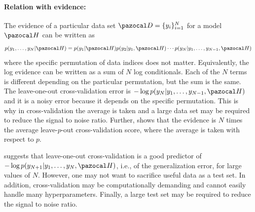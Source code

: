 \paragraph{Relation with evidence:} The evidence of a particular data set $\cD=\{y_i\}_{i=1}^N$ for a model $\cH$ can be written as
\begin{equation}
	p(y_1,\dots,y_N|\cH)=p(y_1|\cH)p(y_2|y_1,\cH)\cdots p(y_N|y_1,\dots,y_{N-1},\cH)
\end{equation}
where the specific permutation of data indices does not matter. 
Equivalently, the log evidence can be written as a sum of $N$ log conditionals.
Each of the $N$ terms is different depending on the particular permutation, but the sum is the same. 
The leave-one-out cross-validation error is $-\log p(y_N|y_1,\dots,y_{N-1},\cH)$ and it is a noisy error because it depends on the specific permutation. 
This is why in cross-validation the average is taken and a large data set may be required to reduce the signal to noise ratio. 
Further, \textcite{fong2020marginal} shows that the evidence is $N$ times the average leave-$p$-out cross-validation score, where the average is taken with respect to $p$.

\textcite{mackay1992bayesian} suggests that leave-one-out cross-validation is a good predictor of $-\log p(y_{N+1}|y_1,\dots,y_{N},\cH)$, i.e., of the generalization error, for large values of $N$.
However, one may not want to sacrifice useful data as a test set.
In addition, cross-validation may be computationally demanding and cannot easily handle many hyperparameters.
Finally, a large test set may be required to reduce the signal to noise ratio. 

